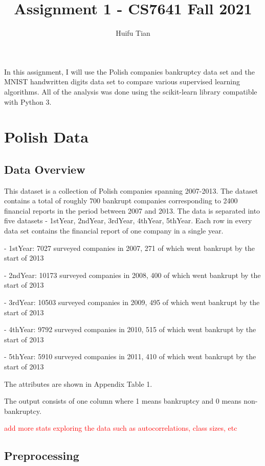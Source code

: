 \documentclass{article}
\title{Assignment 1 - CS7641 Fall 2021}
\author{Huifu Tian}
\newcommand\todo[1]{\textcolor{red}{#1}}
\begin{document}
\maketitle


In this assignment, I will use the Polish companies bankruptcy data set and the MNIST handwritten digits data set to compare various supervised learning algorithms. All of the analysis was done using the scikit-learn library compatible with Python 3.



\section{Polish Data}

\subsection{Data Overview}
This dataset is a collection of Polish companies spanning 2007-2013. The dataset contains a total of roughly 700 bankrupt companies corresponding to 2400 financial reports in the period between 2007 and 2013. The data is separated into five datasets - 1stYear, 2ndYear, 3rdYear, 4thYear, 5thYear. Each row in every data set contains the financial report of one company in a single year. \newline

- 1stYear: 7027 surveyed companies in 2007, 271 of which went bankrupt by the start of 2013

- 2ndYear: 10173 surveyed companies in 2008, 400 of which went bankrupt by the start of 2013

- 3rdYear: 10503 surveyed companies in 2009, 495 of which went bankrupt by the start of 2013

- 4thYear: 9792 surveyed companies in 2010, 515 of which went bankrupt by the start of 2013

- 5thYear: 5910 surveyed companies in 2011, 410 of which went bankrupt by the start of 2013\newline


The attributes are shown in Appendix Table 1. \newline

The output consists of one column where 1 means bankruptcy and 0 means non-bankruptcy. \newline

\todo{add more stats exploring the data such as autocorrelations, class sizes, etc}


\subsection{Preprocessing}
\end{document}
